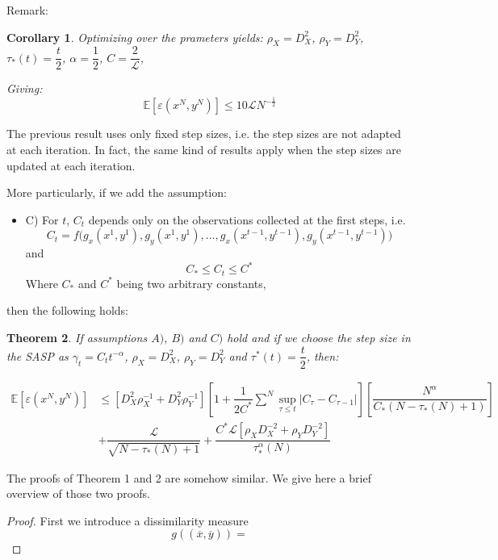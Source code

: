 \documentclass[12pt,reqno]{amsart}
\newtheorem{thm}{Theorem}[section]
\newtheorem{cor}[thm]{Corollary}
\numberwithin{equation}{section}
\begin{document}
Remark: 

\begin{cor}
Optimizing over the prameters yields:
 $\rho_{X} = D_{X}^{2}$,
$\rho_{Y} = D_{Y}^{2}$,
$\tau_{*}(t) = \dfrac{t}{2}$,
$\alpha = \dfrac{1}{2}$,
$C = \dfrac{2}{\mathcal{L}}$,

Giving:
$$
\boxed{ \mathbb{E}[\varepsilon(x^{N},y^{N})]  \leq 10\mathcal{L} N^{-\frac{1}{2}} }
$$
\end{cor}


The previous result uses only fixed step sizes, i.e. the step sizes are not adapted at each iteration.
In fact, the same kind of results apply when the step sizes are updated at each iteration.

More particularly, if we add the assumption:

\begin{itemize}
\item C) For $t$, $C_{t}$ depends only on the observations collected at the first steps, i.e. 
$$C_{t} = f\big(g_{x}(x^{1},y^{1}),g_{y}(x^{1},y^{1}),...,g_{x}(x^{t-1},y^{t-1}),g_{y}(x^{t-1},y^{t-1})\big)$$
and 
$$
C_{*} \leq C_{t} \leq C^{*}
$$
Where $C_{*}$ and $C^{*}$ being two arbitrary constants,

\end{itemize}

then the following holds:

\begin{thm}
If assumptions $A)$, $B)$ and $C)$ hold and if we choose the step size in the SASP as $\gamma_{t} = C_{t}t^{-\alpha}$,
$\rho_{X} = D_{X}^{2}$, $\rho_{Y} = D_{Y}^{2}$ and $\tau^{*}(t) = \dfrac{t}{2}$, then:

\begin{align*}
\mathbb{E}[\varepsilon(x^{N},y^{N})] &\leq [D_{X}^{2}\rho_{X}^{-1} + D_{Y}^{2}\rho_{Y}^{-1} ][1 + \dfrac{1}{2C^{*}}\sum_{}^{N}\sup_{\tau \leq t} | C_{\tau} - C_{\tau-1}|]
[\dfrac{N^{\alpha}}{C_{*}(N - \tau_{*}(N) + 1)}] \\ 
&+ \dfrac{\mathcal{L}}{\sqrt{N - \tau_{*}(N)+ 1}} + \dfrac{C^{*}\mathcal{L}[\rho_{X}D_{X}^{-2} + \rho_{Y}D_{Y}^{-2}]}{\tau_{*}^{\alpha}(N)}
\end{align*}
\end{thm}


The proofs of Theorem 1 and 2 are somehow similar.
We give here a brief overview of those two proofs.

\begin{proof}

First we introduce a dissimilarity measure
$$
g((\overline{x},\overline{y})) = 
$$

\end{proof}
\end{document}
